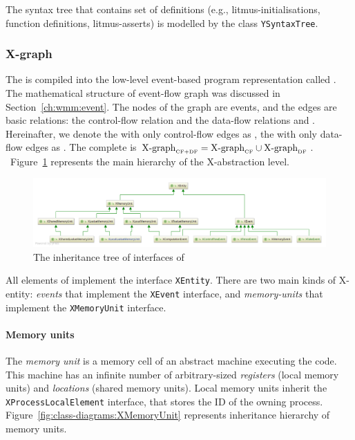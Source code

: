 The syntax tree that contains set of definitions (e.g., litmus-initialisations, function definitions, litmus-asserts) is modelled by the class \texttt{YSyntaxTree}.


\subsubsection{X-graph}
\label{ch:impl:model:xgraph}

The \ytree{} is compiled into the low-level event-based program representation called \textit{\xgraph{}}.
The mathematical structure of event-flow graph was discussed in Section~\ref{ch:wmm:event}.
The nodes of the graph are events, and the edges are basic relations: the control-flow relation \po and the data-flow relations \co and \rf.
Hereinafter, we denote the \xgraph{} with only control-flow edges as \xgraph[CF], the \xgraph{} with only data-flow edges as \xgraph[CF]. The complete \xgraph{} is $\xgraph[CF+DF] = \xgraph[CF] \cup \xgraph[DF]$.
\ Figure~\ref{fig:class-diagrams:XEntity-interfaces} represents the main hierarchy of the X-abstraction level.

\begin{figure}[t]%
  \centering
  \includegraphics[width=\textwidth,keepaspectratio]{img/my/class-diagrams/XEntity-interfaces.png}
  \caption{The inheritance tree of interfaces of \xgraph{}}
  \label{fig:class-diagrams:XEntity-interfaces}
\end{figure}

All elements of \xgraph{} implement the interface \texttt{XEntity}.
There are two main kinds of X-entity: \textit{events} that implement the \texttt{XEvent} interface, and \textit{memory-units} that implement the \texttt{XMemoryUnit} interface.


\paragraph{Memory units}
\label{ch:impl:model:xgraph:mem}

The \textit{memory unit} is a memory cell of an abstract machine executing the code.
This machine has an infinite number of arbitrary-sized \textit{registers} (local memory units) and \textit{locations} (shared memory units).
Local memory units inherit the \texttt{XProcessLocalElement} interface, that stores the ID of the owning process.
Figure~\ref{fig:class-diagrams:XMemoryUnit} represents inheritance hierarchy of memory units.

